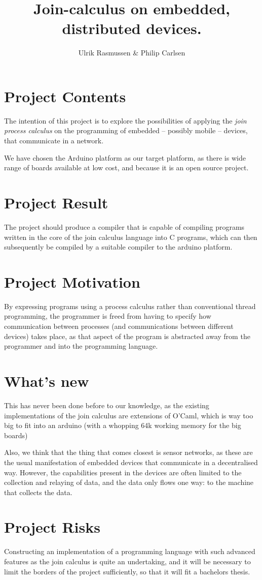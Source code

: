\documentclass[a4paper,draft]{article}
\title{Join-calculus on embedded, distributed devices.}
\author{Ulrik Rasmussen \& Philip Carlsen}
\begin{document}
 \maketitle \section*{Project Contents} The
intention of this project is to explore the possibilities
of applying the \emph{join process calculus} on the
programming of embedded -- possibly mobile -- devices, that
communicate in a network. 

We have chosen the Arduino platform as our target platform,
as there is wide range of boards available at low cost, and
because it is an open source project.

\section*{Project Result}
The project should produce a compiler that is capable of
compiling programs written in the core of the join calculus
language into C programs, which can then subsequently be
compiled by a suitable compiler to the arduino platform.


\section*{Project Motivation}
By expressing programs using a process calculus rather than
conventional thread programming, the programmer is freed
from having to specify how communication between processes
(and communications between different devices) takes place,
as that aspect of the program is abstracted away from the programmer and into the programming language. 

\section*{What's new} 
This has never been done before to our knowledge, as the existing implementations of the join calculus are extensions of O'Caml, which is way too big to fit into an arduino (with a whopping 64k working memory for the big boards)

Also, we think that the thing that comes closest is sensor
networks, as these are the usual manifestation of embedded
devices that communicate in a decentralised way. However,
the capabilities present in the devices are often limited
to the collection and relaying of data, and the data only
flows one way: to the machine that collects the data.

\section*{Project Risks}
Constructing an implementation of a programming language
with such advanced features as the join calculus is quite
an undertaking, and it will be necessary to limit the
borders of the project sufficiently, so that it will fit a
bachelors thesis.
\end{document}

